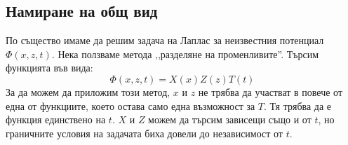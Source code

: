 \documentclass[12pt]{article}
\numberwithin{equation}{section}
\begin{document}
\subsection{Намиране на общ вид}
По същество имаме да решим задача на Лаплас за неизвестния потенциал $\Phi(x,z,t)$. Нека ползваме метода ,,разделяне на променливите''. Търсим функцията във вида:
\begin{equation}
    \label{e:potential-general-form}
    \Phi(x,z,t) = X(x)Z(z)T(t)
\end{equation}
За да можем да приложим този метод, $x$ и $z$ не трябва да участват в повече от една от функциите, което остава само една възможност за $T$. Тя трябва да е функция единствено на $t$. $X$ и $Z$ можем да търсим зависещи също и от $t$, но граничните условия на задачата биха довели до независимост от $t$.
\end{document}
